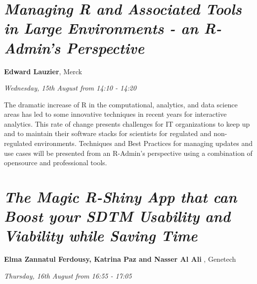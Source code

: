 \documentclass[]{book}
\theoremstyle{definition}
\theoremstyle{definition}
\theoremstyle{definition}
\theoremstyle{remark}
\begin{document}
\hypertarget{managing-r-and-associated-tools-in-large-environments---an-r-admins-perspective}{%
\section{\texorpdfstring{\emph{Managing R and Associated Tools in Large
Environments - an R-Admin's
Perspective}}{Managing R and Associated Tools in Large Environments - an R-Admin's Perspective}}\label{managing-r-and-associated-tools-in-large-environments---an-r-admins-perspective}}

\textbf{Edward Lauzier}, Merck

\emph{Wednesday, 15th August from 14:10 - 14:20}

The dramatic increase of R in the computational, analytics, and data
science areas has led to some innovative techniques in recent years for
interactive analytics. This rate of change presents challenges for IT
organizations to keep up and to maintain their software stacks for
scientists for regulated and non-regulated environments. Techniques and
Best Practices for managing updates and use cases will be presented from
an R-Admin's perspective using a combination of opensource and
professional tools.

\hypertarget{the-magic-r-shiny-app-that-can-boost-your-sdtm-usability-and-viability-while-saving-time}{%
\section{\texorpdfstring{\emph{The Magic R-Shiny App that can Boost your
SDTM Usability and Viability while Saving
Time}}{The Magic R-Shiny App that can Boost your SDTM Usability and Viability while Saving Time}}\label{the-magic-r-shiny-app-that-can-boost-your-sdtm-usability-and-viability-while-saving-time}}

\textbf{Elma Zannatul Ferdousy, Katrina Paz and Nasser Al Ali },
Genetech

\emph{Thursday, 16th August from 16:55 - 17:05}
\end{document}
